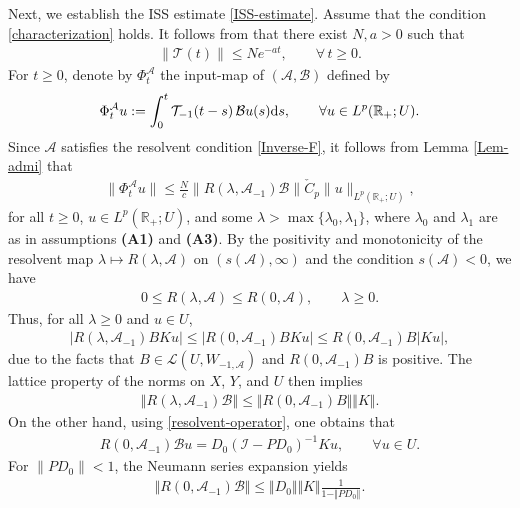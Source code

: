 \documentclass[onecolumn]{autart}
\def\R{{\mathbb{R}}}
\def\la{\lambda}
\def\calL{{\mathcal{L}}}
\def\calT{{\mathcal{T}}}
\def\calB{{\mathcal{B}}}
\def\calA{{\mathcal{A}}}
\def\R{\mathbb R}
\numberwithin{equation}{section}
\begin{document}
      Next, we establish the ISS estimate \eqref{ISS-estimate}. Assume that the condition \eqref{characterization} holds. It follows from \cite[Thm. 2]{El1} that there exist $N, a > 0$ such that
		\begin{align}\label{Expon-sta}
			\|\calT(t)\| \le N e^{-a t}, \qquad \forall\, t \ge 0.
		\end{align}
		For $t \ge 0$, denote by $\Phi_t^{\calA}$ the input-map of $(\calA, \calB)$ defined by
		\begin{align*}
			\Phi_t^{\calA} u := \int_0^t \calT_{-1}(t-s)\, \calB u(s) {\rm{d}}s, \qquad
			\forall u \in L^p(\mathbb{R}_+; U).
		\end{align*}
		Since $\calA$ satisfies the resolvent condition \eqref{Inverse-F}, it follows from Lemma \ref{Lem-admi} that
		\begin{align*}
			\|\Phi_t^{\calA} u\| \le \frac{N}{c} \left\| R(\lambda, \calA_{-1}) \calB \right\|
			\check{C}_p\|u\|_{L^p(\R_+; U)},
		\end{align*}
		for all $t \ge 0$, $u \in L^p(\R_+; U)$, and some $\lambda > \max\{\lambda_0,\lambda_1\}$, where $\lambda_0$ and $\lambda_1$ are as in assumptions {\bf (A1)} and {\bf (A3)}. By the positivity and monotonicity of the resolvent map $\lambda \mapsto R(\lambda, \calA)$ on $(s(\calA),\infty)$ and the condition $s(\calA)<0$, we have
		\begin{align*}
			0\le R(\lambda, \calA) \le R(0, \calA), \qquad \la \ge 0.
		\end{align*}
		Thus, for all $\lambda \ge 0$ and $u \in U$,
		\begin{align*}
			\left\vert R(\lambda, \calA_{-1}) B K u \right\vert \le  \left\vert R(0, \calA_{-1}) B K u \right\vert \le  R(0, \calA_{-1}) B  \left\vert K u\right\vert,
		\end{align*}
		due to the facts that $B\in \calL(U, W_{-1, \calA})$ and $R(0, \calA_{-1}) B$ is positive. The lattice property of the norms on $X$, $Y$, and $U$ then implies
		\begin{align*}
			\left\Vert R(\la,\calA_{-1})\calB\right\Vert \le \Vert R(0,\calA_{-1})B \Vert \Vert K\Vert.
		\end{align*}
		On the other hand, using \eqref{resolvent-operator}, one obtains that
		\begin{align*}
			R(0,\calA_{-1}) \calB u  = D_0 (\mathcal{I}-P D_0)^{-1} Ku, \qquad \forall u\in U.
		\end{align*}
		For $\|P D_0\| < 1$, the Neumann series expansion yields
		\begin{align*}
			\Vert R(0, \calA_{-1}) \calB \Vert \le \Vert D_0\Vert \Vert K\Vert  \frac{1}{1 - \Vert P D_0\Vert}.
		\end{align*}
\end{document}
